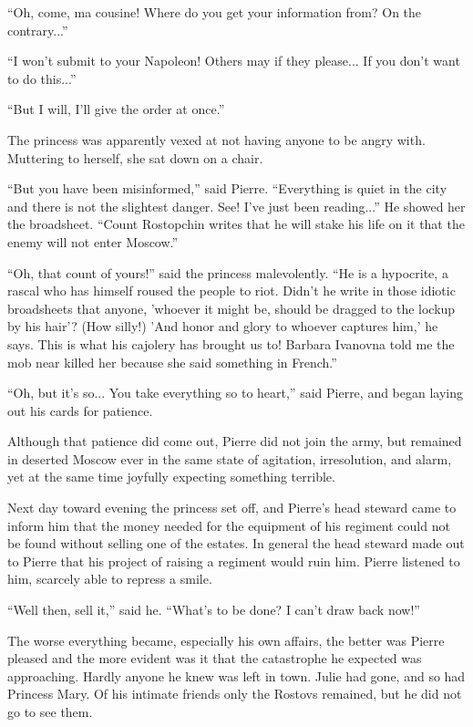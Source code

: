 ``Oh, come, ma cousine! Where do you get your information from?
On the contrary...''

``I won't submit to your Napoleon! Others may if they
please... If you don't want to do this...''

``But I will, I'll give the order at once.''

The princess was apparently vexed at not having anyone to be
angry with.  Muttering to herself, she sat down on a chair.

``But you have been misinformed,'' said Pierre. ``Everything is
quiet in the city and there is not the slightest danger. See!
I've just been reading...'' He showed her the broadsheet. ``Count
Rostopchin writes that he will stake his life on it that the
enemy will not enter Moscow.''

``Oh, that count of yours!'' said the princess malevolently. ``He
is a hypocrite, a rascal who has himself roused the people to
riot. Didn't he write in those idiotic broadsheets that anyone,
'whoever it might be, should be dragged to the lockup by his
hair'? (How silly!) 'And honor and glory to whoever captures
him,' he says. This is what his cajolery has brought us to!
Barbara Ivanovna told me the mob near killed her because she said
something in French.''

``Oh, but it's so... You take everything so to heart,'' said
Pierre, and began laying out his cards for patience.

Although that patience did come out, Pierre did not join the
army, but remained in deserted Moscow ever in the same state of
agitation, irresolution, and alarm, yet at the same time joyfully
expecting something terrible.

Next day toward evening the princess set off, and Pierre's head
steward came to inform him that the money needed for the
equipment of his regiment could not be found without selling one
of the estates. In general the head steward made out to Pierre
that his project of raising a regiment would ruin him. Pierre
listened to him, scarcely able to repress a smile.

``Well then, sell it,'' said he. ``What's to be done? I can't
draw back now!''

The worse everything became, especially his own affairs, the
better was Pierre pleased and the more evident was it that the
catastrophe he expected was approaching. Hardly anyone he knew
was left in town. Julie had gone, and so had Princess Mary. Of
his intimate friends only the Rostovs remained, but he did not go
to see them.

